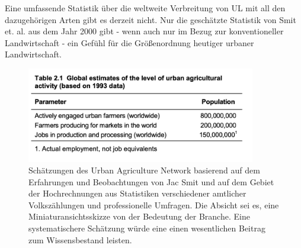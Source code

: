 \documentclass{scrartcl}
\begin{document}



Eine umfassende Statistik über die weltweite Verbreitung von UL mit all den dazugehörigen Arten gibt es derzeit nicht. Nur die geschätzte Statistik von Smit et. al. aus dem Jahr 2000 gibt - wenn auch nur im Bezug zur konventioneller Landwirtschaft - ein Gefühl für die Größenordnung heutiger urbaner Landwirtschaft.
\begin{figure}[htbp]
    \centering
    \includegraphics[width=10cm]{image_folder/800000ul.png}
  \caption{Schätzungen des Urban Agriculture Network basierend auf dem Erfahrungen und Beobachtungen von Jac Smit und auf dem Gebiet der Hochrechnungen aus Statistiken verschiedener amtlicher Volkszählungen und professionelle Umfragen. Die Absicht sei es, eine Miniaturansichtsskizze von der Bedeutung der Branche. Eine systematischere Schätzung würde eine einen wesentlichen Beitrag zum Wissensbestand leisten.}
  \label{fig:plantagon}
\end{figure} 
\end{document}
